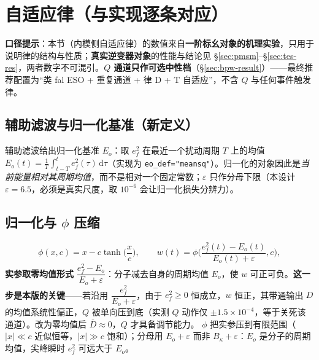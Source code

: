 \documentclass[11pt,a4paper]{article}
\theoremstyle{remark}\newtheorem{remark}{注}
\newcommand{\ef}{e_f}
\begin{document}
\section{自适应律（与实现逐条对应）}\label{sec:law}
\noindent\textbf{口径提示}：本节（内模侧自适应律）的数值来自\textbf{一阶标幺对象的机理实验}，只用于说明律的结构与性质；\textbf{真实逆变器对象}的性能与结论见 §\ref{sec:pmsm}--§\ref{sec:tes-res}，两者数字不可混引。\textbf{$Q$ 通道只作可选中性档}（§\ref{sec:bpw-result}）——最终推荐配置为“类 fal ESO + 重复通道 + 律 D + T 自适应”，不含 $Q$ 与任何事件触发律。
\subsection{辅助滤波与归一化基准（新定义）}\label{sec:aux}
辅助滤波给出归一化基准 $E_o$：取 $e_f^2$ 在最近一个扰动周期 $T$ 上的均值 $E_o(t)=\frac1T\int_{t-T}^{t}e_f^{2}(\tau)\,\mathrm d\tau$（实现为 \texttt{eo\_def="meansq"}）。归一化的对象因此是\emph{当前能量相对其周期均值}，而不是相对一个固定常数；$\varepsilon$ 只作分母下限（本设计 $\varepsilon=6.5$，必须是真实尺度，取 $10^{-6}$ 会让归一化损失分辨力）。
\subsection{归一化与 $\phi$ 压缩}\label{sec:x}
\begin{equation}
  \phi(x,c)=x-c\tanh\!\Big(\frac{x}{c}\Big),\qquad
  w(t)=\phi\!\Big(\frac{\ef^{2}(t)-E_o(t)}{E_o(t)+\varepsilon}, c\Big),
  \label{eq:phi-x}
\end{equation}
\textbf{实参取零均值形式} $\dfrac{\ef^{2}-E_o}{E_o+\varepsilon}$：分子减去自身的周期均值 $E_o$，使 $w$ 可正可负。\textbf{这一步是本版的关键}——若沿用 $\dfrac{\ef^{2}}{E_o+\varepsilon}$，由于 $\ef^{2}\ge0$ 恒成立，$w$ 恒正，其带通输出 $D$ 的均值系统性偏正，$Q$ 被单向压到底（实测 $Q$ 动作仅 $\pm1.5\times10^{-4}$，等于关死该通道）。改为零均值后 $\overline{D}\approx0$，$Q$ 才具备调节能力。
$\phi$ 把实参压到有限范围（$|x|\ll c$ 近似恒等，$|x|\gg c$ 饱和）；分母用 $E_o+\varepsilon$ 而非 $B_\kappa+\varepsilon$：$E_o$ 是分子的周期均值，尖峰瞬时 $\ef^{2}$ 可远大于 $E_o$。
\end{document}
